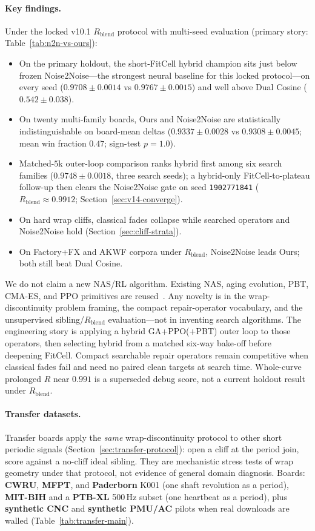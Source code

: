 \paragraph{Key findings.}
Under the locked v10.1 $R_{\mathrm{blend}}$ protocol with multi-seed evaluation (primary story: Table~\ref{tab:n2n-vs-ours}):
\begin{itemize}
  \item On the primary holdout, the short-FitCell hybrid champion sits just below frozen Noise2Noise---the strongest neural baseline for this locked protocol---on every seed ($0.9708{\pm}0.0014$ vs $0.9767{\pm}0.0015$) and well above Dual Cosine ($0.542{\pm}0.038$).
  \item On twenty multi-family boards, Ours and Noise2Noise are statistically indistinguishable on board-mean deltas ($0.9337{\pm}0.0028$ vs $0.9308{\pm}0.0045$; mean win fraction $0.47$; sign-test $p{=}1.0$).
  \item Matched-$5$k outer-loop comparison ranks hybrid first among six search families ($0.9748{\pm}0.0018$, three search seeds); a hybrid-only FitCell-to-plateau follow-up then clears the Noise2Noise gate on seed \texttt{1902771841} ($R_{\mathrm{blend}}{\approx}0.9912$; Section~\ref{sec:v14-converge}).
  \item On hard wrap cliffs, classical fades collapse while searched operators and Noise2Noise hold (Section~\ref{sec:cliff-strata}).
  \item On Factory+FX and AKWF corpora under $R_{\mathrm{blend}}$, Noise2Noise leads Ours; both still beat Dual Cosine.
\end{itemize}
We do not claim a new NAS/RL algorithm.
Existing NAS, aging evolution, PBT, CMA-ES, and PPO primitives are reused~\cite{elsken2019,real2019,jaderberg2017,schulman2017}.
Any novelty is in the wrap-discontinuity problem framing, the compact repair-operator vocabulary, and the unsupervised sibling/$R_{\mathrm{blend}}$ evaluation---not in inventing search algorithms.
The engineering story is applying a hybrid GA+PPO(+PBT) outer loop to those operators, then selecting hybrid from a matched six-way bake-off before deepening FitCell.
Compact searchable repair operators remain competitive when classical fades fail and need no paired clean targets at search time.
Whole-curve prolonged $R$ near $0.991$ is a superseded debug score, not a current holdout result under $R_{\mathrm{blend}}$.

\paragraph{Transfer datasets.}
Transfer boards apply the \emph{same} wrap-discontinuity protocol to other short periodic signals
(Section~\ref{sec:transfer-protocol}): open a cliff at the period join, score against a no-cliff ideal sibling.
They are mechanistic stress tests of wrap geometry under that protocol, not evidence of general domain diagnosis.
Boards: \textbf{CWRU}, \textbf{MFPT}, and \textbf{Paderborn} K001 (one shaft revolution as a period),
\textbf{MIT-BIH} and a \textbf{PTB-XL} 500\,Hz subset (one heartbeat as a period),
plus \textbf{synthetic CNC} and \textbf{synthetic PMU/AC} pilots when real downloads are walled
(Table~\ref{tab:transfer-main}).

